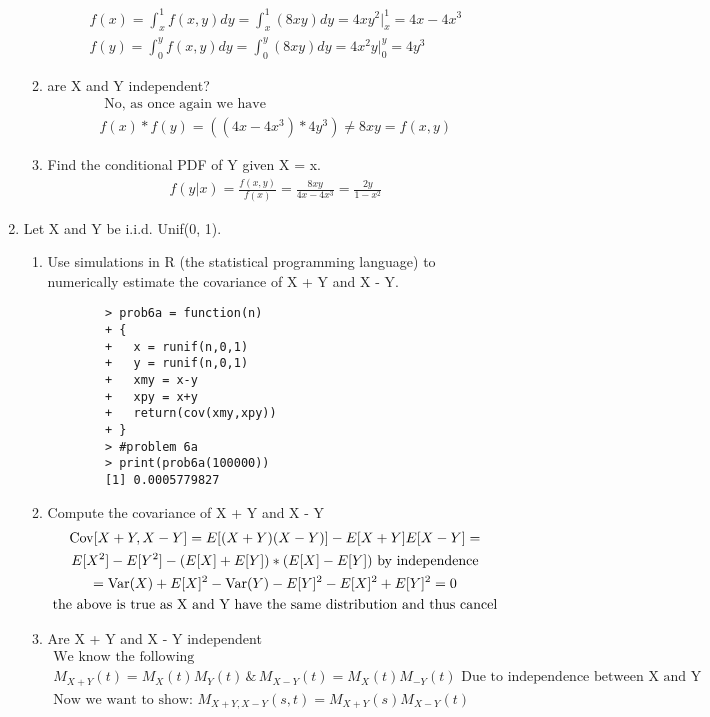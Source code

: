 \documentclass[11pt]{article}
\newcommand{\Var}{\mathop{\rm Var}}
\newcommand{\Cov}{\mathop{\rm Cov}}
\begin{document}
\begin{enumerate}
\begin{enumerate}
	\begin{gather}
	f(x) = \int_{x}^{1}f(x,y)dy = \int_{x}^{1}(8xy)dy  = 4xy^2\big|_x^1 = 4x - 4x^3 \\
	f(y) = \int_{0}^{y}f(x,y)dy = \int_{0}^{y}(8xy)dy  = 4x^2y\big|_0^y = 4y^3
	\end{gather}
	\item are X and Y independent?
	\begin{gather}
		\text{ No, as once again we have }\\
		f(x)*f(y) = ((4x - 4x^3) * 4y^3) \ne 8xy = f(x,y)
	\end{gather}
	\item Find the conditional PDF of Y given X = x.
	\begin{gather}
		f(y|x) = \frac{f(x,y)}{f(x)} = \frac{8xy}{4x - 4x^3} = \frac{2y}{1 - x^2}
	\end{gather}
\end{enumerate}
\item Let X and Y be i.i.d. Unif(0, 1).
\begin{enumerate}
	\item Use simulations in R (the statistical programming language) to numerically estimate the covariance
	of X + Y and X - Y.
	\begin{verbatim}
		> prob6a = function(n)
		+ {
		+   x = runif(n,0,1)
		+   y = runif(n,0,1)
		+   xmy = x-y
		+   xpy = x+y
		+   return(cov(xmy,xpy))
		+ }
		> #problem 6a
		> print(prob6a(100000))
		[1] 0.0005779827
	\end{verbatim}
	\item Compute the covariance of X + Y and X - Y
	\begin{gather}
		\Cov[X+Y,X-Y] = E[(X+Y)(X-Y)] - E[X+Y]E[X-Y] =\\
		  E[X^2] - E[Y^2] - (E[X]+E[Y])*(E[X]-E[Y]) \text{ by independence}\\
		  = \Var(X)+E[X]^2 - \Var(Y)-E[Y]^2 - E[X]^2 + E[Y]^2 = 0\\
		  \text{the above is true as X and Y have the same distribution and thus cancel}
	\end{gather}
	\item Are X + Y and X - Y independent
	\begin{gather}
		\text{We know the following}\\
		M_{X+Y}(t)=M_X(t)M_Y(t)\,\&\,M_{X-Y}(t)=M_X(t)M_{-Y}(t) \text{ Due to independence between X and Y}\\
		\text{Now we want to show: }M_{X+Y,X-Y}(s,t)=M_{X+Y}(s)M_{X-Y}(t) \\

\end{gather}
\end{enumerate}
\end{enumerate}
\end{document}

